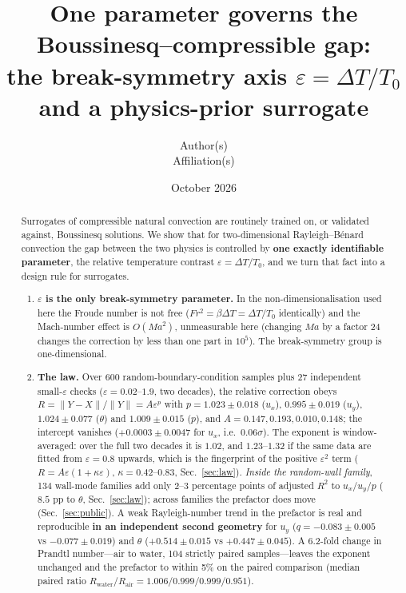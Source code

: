 \documentclass[11pt,a4paper]{article}
\title{One parameter governs the Boussinesq--compressible gap:\\
the break-symmetry axis $\varepsilon=\Delta T/T_0$ and a physics-prior surrogate}
\author{Author(s)\\[2pt] \small Affiliation(s)}
\date{October 2026}
\begin{document}
\maketitle

\begin{abstract}
Surrogates of compressible natural convection are routinely trained on, or validated against,
Boussinesq solutions. We show that for two-dimensional Rayleigh--B\'enard convection the gap
between the two physics is controlled by \textbf{one exactly identifiable parameter}, the relative
temperature contrast $\varepsilon=\Delta T/T_0$, and we turn that fact into a design rule for surrogates.

\begin{enumerate}
\item \textbf{$\varepsilon$ is the only break-symmetry parameter.} In the non-dimensionalisation used
here the Froude number is not free ($Fr^2=\beta\Delta T=\Delta T/T_0$ identically) and the
Mach-number effect is $O(Ma^2)$, unmeasurable here (changing $Ma$ by a factor 24 changes the
correction by less than one part in $10^5$). The break-symmetry group is one-dimensional.

\item \textbf{The law.} Over 600 random-boundary-condition samples plus 27 independent small-$\varepsilon$
checks ($\varepsilon=0.02$--$1.9$, two decades), the relative correction obeys
$R=\|Y-X\|/\|Y\|=A\varepsilon^p$ with $p=1.023\pm0.018$ ($u_x$), $0.995\pm0.019$ ($u_y$),
$1.024\pm0.077$ ($\theta$) and $1.009\pm0.015$ ($p$), and $A=0.147,0.193,0.010,0.148$; the
intercept vanishes ($+0.0003\pm0.0047$ for $u_x$, i.e.\ $0.06\sigma$). The exponent is
window-averaged: over the full two decades it is $1.02$, and $1.23$--$1.32$ if the same data are
fitted from $\varepsilon=0.8$ upwards, which is the fingerprint of the positive $\varepsilon^2$ term
($R=A\varepsilon(1+\kappa\varepsilon)$, $\kappa=0.42$--$0.83$, Sec.~\ref{sec:law}).
\emph{Inside the random-wall family}, 134 wall-mode families add only 2--3 percentage points of
adjusted $R^2$ to $u_x/u_y/p$ ($8.5$ pp to $\theta$, Sec.~\ref{sec:law}); across families the
prefactor does move (Sec.~\ref{sec:public}). A weak Rayleigh-number trend in the prefactor is real
and reproducible \textbf{in an independent second geometry} for $u_y$ ($q=-0.083\pm0.005$ vs
$-0.077\pm0.019$) and $\theta$ ($+0.514\pm0.015$ vs $+0.447\pm0.045$). A 6.2-fold change in
Prandtl number---air to water, 104 strictly paired samples---leaves the exponent unchanged and the
prefactor to within 5\% on the paired comparison (median paired ratio $R_{\mathrm{water}}/R_{\mathrm{air}}=
1.006/0.999/0.999/0.951$).


\end{enumerate}
\end{abstract}
\end{document}
